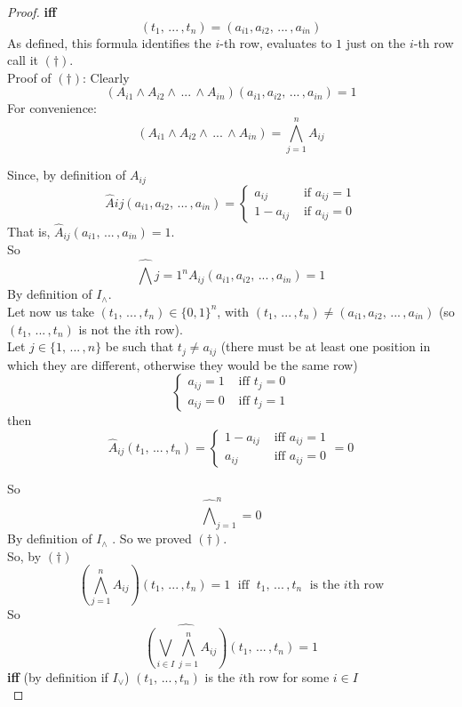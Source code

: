 \documentclass[11pt]{article}
\begin{document}
\begin{proof}
		\textbf{iff}
		$$ (t_1, \, ... \, , t_n) =  (a_{i1}, a_{i2}, \, ... \, , a_{in}) $$
		As defined, this formula identifies the $i$-th row, evaluates to $1$ just on the $i$-th row call it $(\dag)$. \\
		
		Proof of $(\dag)$: Clearly
		$$ \left(A_{i1} \wedge A_{i2} \wedge \, ... \, \wedge A_{in}\right) (a_{i1}, a_{i2}, \, ... \, , a_{in}) = 1 $$
		For convenience: 
		$$ \left(A_{i1} \wedge A_{i2} \wedge \, ... \, \wedge A_{in}\right) = \bigwedge_{j = 1}^n A_{ij} $$
		
		Since, by definition of $A_{ij}$
		$$ \hat A{ij} (a_{i1}, a_{i2}, \, ... \, , a_{in})  = \begin{cases}
			a_{ij} & \text{ if } a_{ij} = 1\\
			1 - a_{ij} & \text{ if } a_{ij} = 0
		\end{cases}$$
		That is, $\hat A_{ij} (a_{i1}, \, ... \, , a_{in}) = 1$.\\
		So
		$$ \widehat \bigwedge{j=1}^n A_{ij} (a_{i1}, a_{i2}, \, ... \, , a_{in}) = 1$$
		By definition of $I_\wedge$.\\
		
		Let now us take $(t_1, \, ... \, , t_n) \in \{0,1\}^n$, with $(t_1, \, ... \, , t_n) \neq (a_{i1}, a_{i2}, \, ... \, , a_{in})$ (so $(t_1, \, ... \, , t_n)$ is not the $i$th row).\\
		
		Let $j \in \{1, \, ... \, , n\}$ be such that $t_j \neq a_{ij}$ (there must be at least one position in which they are different, otherwise they would be the same row)
		$$ 
		\begin{cases}
			a_{ij} = 1 & \text{ iff } t_j = 0 \\
			a_{ij} = 0 & \text{ iff } t_j = 1
		\end{cases}
		$$
		then 
		$$ \hat A_{ij} (t_1, \, ... \, , t_n) = 
		\begin{cases}
			1 - a_{ij} & \text{ iff } a_{ij} = 1 \\
			a_{ij} & \text{ iff } a_{ij} = 0
		\end{cases}
		= 0 
		$$
		
		So 
		$$ \widehat \bigwedge_{j=1}^n = 0$$
		By definition of $I_\wedge$ . So we proved $(\dag)$.\\
		
		So, by $(\dag)$ 
		$$ \left( \bigwedge_{j=1}^n A_{ij} \right) (t_1, \, ... \, , t_n) = 1 \; \text{ iff } \; t_1, \, ... \, , t_n \; \text{ is the } i \text{th row} $$
		So 
		$$\widehat{\left( \bigvee_{i \in I} \bigwedge_{j=1}^n A_{ij}\right)} (t_1, \, ... \, , t_n)  = 1 $$
		\textbf{iff} (by definition if $I_\vee$) $(t_1, \, ... \, , t_n)$ is the $i$th row for some $i \in I$\\
		

\end{proof}
\end{document}
